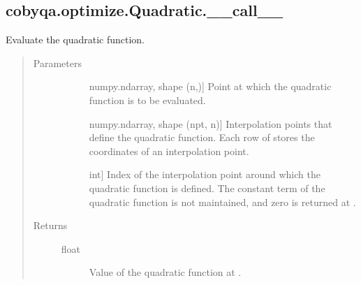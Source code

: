\documentclass[letterpaper,10pt,english]{sphinxmanual}
\begin{document}
\begin{fulllineitems}
\subsection{cobyqa.optimize.Quadratic.\_\_call\_\_}
\label{\detokenize{refs/generated/cobyqa.optimize.Quadratic.__call__:cobyqa-optimize-quadratic-call}}\label{\detokenize{refs/generated/cobyqa.optimize.Quadratic.__call__::doc}}

\begin{fulllineitems}
\label{\detokenize{refs/generated/cobyqa.optimize.Quadratic.__call__:cobyqa.optimize.Quadratic.__call__}}
\sphinxAtStartPar
Evaluate the quadratic function.
\begin{quote}\begin{description}
\item[{Parameters}] \leavevmode\begin{description}
\item[{}] \leavevmode{[}numpy.ndarray, shape (n,){]}
\sphinxAtStartPar
Point at which the quadratic function is to be evaluated.

\item[{}] \leavevmode{[}numpy.ndarray, shape (npt, n){]}
\sphinxAtStartPar
Interpolation points that define the quadratic function. Each row of
 stores the coordinates of an interpolation point.

\item[{}] \leavevmode{[}int{]}
\sphinxAtStartPar
Index of the interpolation point around which the quadratic function
is defined. The constant term of the quadratic function is not
maintained, and zero is returned at .

\end{description}

\item[{Returns}] \leavevmode\begin{description}
\item[{float}] \leavevmode
\sphinxAtStartPar
Value of the quadratic function at .

\end{description}


\end{description}
\end{quote}
\end{fulllineitems}
\end{fulllineitems}
\end{document}
